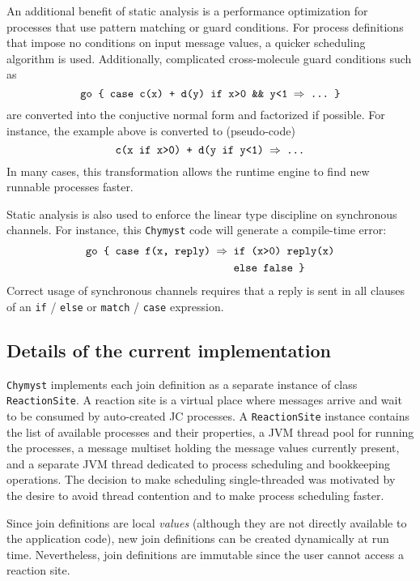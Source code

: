 \documentclass[sigplan,10pt]{acmart}\settopmatter{}
\begin{document}
An additional benefit of static analysis is a performance optimization
for processes that use pattern matching or guard conditions. For process
definitions that impose no conditions on input message values, a quicker
scheduling algorithm is used. Additionally, complicated cross-molecule
guard conditions such as
\[
\text{\texttt{go \{ case c(x) + d(y) if x>0 \&\& y<1 \ensuremath{\Rightarrow} ...~\}}}
\]
are converted into the conjuctive normal form and factorized if possible.
For instance, the example above is converted to (pseudo-code)
\[
\text{\texttt{c(x if x>0) + d(y if y<1) \ensuremath{\Rightarrow} ...}}
\]
In many cases, this transformation allows the runtime engine to find
new runnable processes faster.

Static analysis is also used to enforce the linear type discipline
on synchronous channels. For instance, this \texttt{Chymyst} code
will generate a compile-time error:
\begin{align*}
\text{\texttt{go \{ case f(x, reply) \ensuremath{\Rightarrow}}} & \text{\texttt{ if (x>0) reply(x)}}\\
 & \text{\text{\texttt{ else false \}}}}
\end{align*}
Correct usage of synchronous channels requires that a reply is sent
in all clauses of an \texttt{if} / \texttt{else} or \texttt{match}
/ \texttt{case} expression.

\subsection{Details of the current implementation}

\texttt{Chymyst} implements each join definition as a separate instance
of class \texttt{ReactionSite}. A reaction site is a virtual place
where messages arrive and wait to be consumed by auto-created JC processes.
A \texttt{ReactionSite} instance contains the list of available processes
and their properties, a JVM thread pool for running the processes,
a message multiset holding the message values currently present, and
a separate JVM thread dedicated to process scheduling and bookkeeping
operations. The decision to make scheduling single-threaded was motivated
by the desire to avoid thread contention and to make process scheduling
faster.

Since join definitions are local \emph{values} (although they are
not directly available to the application code), new join definitions
can be created dynamically at run time. Nevertheless, join definitions
are immutable since the user cannot access a reaction site.
\end{document}
